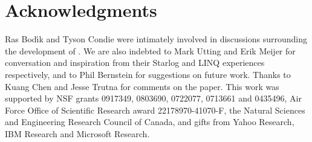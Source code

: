 \section{Acknowledgments}
Ras Bod\'{\i}k and Tyson Condie were intimately involved in discussions
surrounding the development of \lang.  We are also indebted to Mark Utting and
Erik Meijer for conversation and inspiration from their Starlog and LINQ
experiences respectively, and to Phil Bernstein for suggestions on future work.
Thanks to Kuang Chen and Jesse Trutna for comments on the paper. This work was
supported by NSF grants 0917349, 0803690, 0722077, 0713661 and 0435496, Air
Force Office of Scientific Research award 22178970-41070-F, the Natural Sciences
and Engineering Research Council of Canada, and gifts from Yahoo Research, IBM
Research and Microsoft Research.
